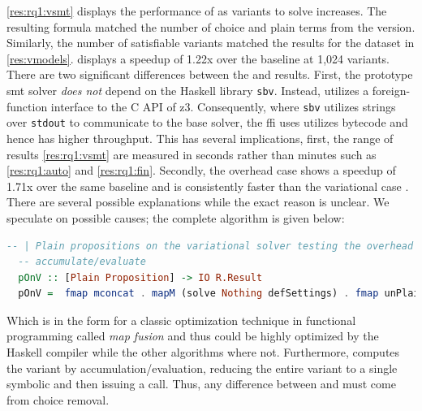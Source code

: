 \autoref{res:rq1:vsmt} displays the performance of \vsmt{} as variants to solve
increases. The resulting \evpl{} formula matched the number of choice and plain
terms from the \vsat{} version. Similarly, the number of satisfiable variants
matched the results for the \fin{} dataset in \autoref{res:vmodels}. \vsmt{}
displays a speedup of 1.22x over the baseline \vTop{} at 1,024 variants. There
are two significant differences between the \vsmt{} and \vsat{} results. First,
the prototype \ac{smt} solver \emph{does not} depend on the Haskell library
\texttt{sbv}. Instead, \vsmt{} utilizes a foreign-function interface to the C
API of z3. Consequently, where \texttt{sbv} utilizes strings over
\texttt{stdout} to communicate to the base solver, the ffi \vsmt{} uses utilizes
bytecode and hence has higher throughput. This has several implications, first,
the range of results \autoref{res:rq1:vsmt} are measured in seconds rather than
minutes such as \autoref{res:rq1:auto} and \autoref{res:rq1:fin}. Secondly, the
overhead case \pTov{} shows a speedup of 1.71x over the same baseline and is
consistently faster than the variational case \vTov{}. There are several
possible explanations while the exact reason is unclear. We speculate on
possible causes; the complete \pTov{} algorithm is given below:
%
\begin{lstlisting}[columns=flexible,keepspaces=true,language=Haskell]
  -- | Plain propositions on the variational solver testing the overhead of
  -- accumulate/evaluate
  pOnV :: [Plain Proposition] -> IO R.Result
  pOnV =  fmap mconcat . mapM (solve Nothing defSettings) . fmap unPlain
\end{lstlisting}

Which is in the form for a classic optimization technique in functional
programming called \emph{map fusion} and
thus could be highly optimized by the Haskell compiler while the other
algorithms where not. Furthermore, \pTov{} computes the variant by
accumulation/evaluation, reducing the entire variant to a single symbolic and
then issuing a  call. Thus, any difference between \vTov{} and
\pTov{} must come from choice removal.

